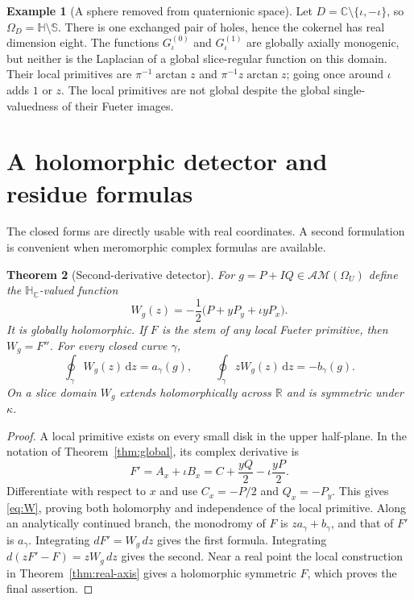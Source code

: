 \documentclass[11pt,a4paper]{article}
\numberwithin{equation}{section}
\newtheorem{theorem}{Theorem}[section]
\theoremstyle{definition}
\newtheorem{example}[theorem]{Example}
\theoremstyle{remark}
\newcommand{\R}{\mathbb R}
\newcommand{\C}{\mathbb C}
\newcommand{\HH}{\mathbb H}
\newcommand{\HC}{\mathbb H_{\C}}
\newcommand{\SSS}{\mathbb S}
\newcommand{\AM}{\mathcal{AM}}
\newcommand{\dd}{\,\mathrm d}
\begin{document}
\begin{example}[A sphere removed from quaternionic space]\label{ex:removed-sphere}
Let $D=\C\setminus\{\iota,-\iota\}$, so
$\Omega_D=\HH\setminus\SSS$. There is one exchanged pair of holes, hence the
cokernel has real dimension eight. The functions $G_{\iota}^{(0)}$ and
$G_{\iota}^{(1)}$ are globally axially monogenic, but neither is the Laplacian
of a global slice-regular function on this domain. Their local primitives are
$\pi^{-1}\arctan z$ and $\pi^{-1}z\arctan z$; going once around $\iota$
adds $1$ or $z$. The local primitives are not global despite the global
single-valuedness of their Fueter images.
\end{example}

\section{A holomorphic detector and residue formulas}
\label{sec:detector}

The closed forms are directly usable with real coordinates. A second
formulation is convenient when meromorphic complex formulas are available.

\begin{theorem}[Second-derivative detector]\label{thm:detector}
For $g=P+IQ\in\AM(\Omega_U)$ define the $\HC$-valued function
\begin{equation}\label{eq:W}
 W_g(z)=-\frac12\bigl(P+yP_y+\iota yP_x\bigr).
\end{equation}
It is globally holomorphic. If $F$ is the stem of any local Fueter primitive,
then $W_g=F''$. For every closed curve $\gamma$,
\begin{equation}\label{eq:W-periods}
 \oint_\gamma W_g(z)\dd z=a_\gamma(g),\qquad
 \oint_\gamma zW_g(z)\dd z=-b_\gamma(g).
\end{equation}
On a slice domain $W_g$ extends holomorphically across $\R$ and is symmetric
under $\kappa$.
\end{theorem}
\begin{proof}
A local primitive exists on every small disk in the upper half-plane. In the
notation of Theorem~\ref{thm:global}, its complex derivative is
\[
 F'=A_x+\iota B_x=C+\frac{yQ}{2}-\iota\frac{yP}{2}.
\]
Differentiate with respect to $x$ and use $C_x=-P/2$ and $Q_x=-P_y$.
This gives \eqref{eq:W}, proving both holomorphy and independence of the local
primitive. Along an analytically continued branch, the monodromy of $F$ is
$za_\gamma+b_\gamma$, and that of $F'$ is $a_\gamma$. Integrating
$dF'=W_g\,dz$ gives the first formula. Integrating
$d(zF'-F)=zW_g\,dz$ gives the second. Near a real point the local construction
in Theorem~\ref{thm:real-axis} gives a holomorphic symmetric $F$, which proves
the final assertion.
\end{proof}
\end{document}
